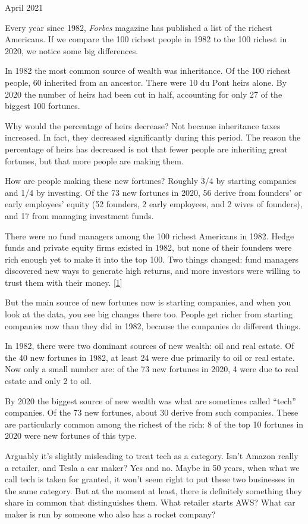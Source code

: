 April 2021

Every year since 1982, \emph{Forbes} magazine has published a list of
the richest Americans. If we compare the 100 richest people in 1982 to
the 100 richest in 2020, we notice some big differences.

In 1982 the most common source of wealth was inheritance. Of the 100
richest people, 60 inherited from an ancestor. There were 10 du Pont
heirs alone. By 2020 the number of heirs had been cut in half,
accounting for only 27 of the biggest 100 fortunes.

Why would the percentage of heirs decrease? Not because inheritance
taxes increased. In fact, they decreased significantly during this
period. The reason the percentage of heirs has decreased is not that
fewer people are inheriting great fortunes, but that more people are
making them.

How are people making these new fortunes? Roughly 3/4 by starting
companies and 1/4 by investing. Of the 73 new fortunes in 2020, 56
derive from founders' or early employees' equity (52 founders, 2 early
employees, and 2 wives of founders), and 17 from managing investment
funds.

There were no fund managers among the 100 richest Americans in 1982.
Hedge funds and private equity firms existed in 1982, but none of their
founders were rich enough yet to make it into the top 100. Two things
changed: fund managers discovered new ways to generate high returns, and
more investors were willing to trust them with their money.
{[}\hyperref[f1n]{1}{]}

But the main source of new fortunes now is starting companies, and when
you look at the data, you see big changes there too. People get richer
from starting companies now than they did in 1982, because the companies
do different things.

In 1982, there were two dominant sources of new wealth: oil and real
estate. Of the 40 new fortunes in 1982, at least 24 were due primarily
to oil or real estate. Now only a small number are: of the 73 new
fortunes in 2020, 4 were due to real estate and only 2 to oil.

By 2020 the biggest source of new wealth was what are sometimes called
``tech'' companies. Of the 73 new fortunes, about 30 derive from such
companies. These are particularly common among the richest of the rich:
8 of the top 10 fortunes in 2020 were new fortunes of this type.

Arguably it's slightly misleading to treat tech as a category. Isn't
Amazon really a retailer, and Tesla a car maker? Yes and no. Maybe in 50
years, when what we call tech is taken for granted, it won't seem right
to put these two businesses in the same category. But at the moment at
least, there is definitely something they share in common that
distinguishes them. What retailer starts AWS? What car maker is run by
someone who also has a rocket company?

